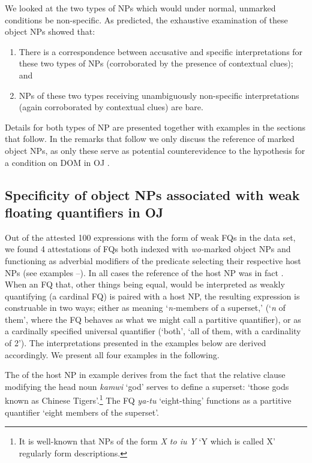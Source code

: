 \documentclass[output=paper]{LSP/langsci}
\begin{document}
We looked at the two types of NPs which would under normal, unmarked
conditions be non-specific. As predicted, the exhaustive examination
of these object NPs showed that:

\begin{exe}
\ex%
\label{07-fr-ex:8}
\renewcommand{\labelenumi}{\alph{enumi}}
\begin{enumerate}
\item There is a correspondence between accusative  and specific interpretations for these two types of NPs (corroborated by the presence of contextual clues); and 
\item NPs of these two types receiving unambiguously non-specific interpretations (again corroborated by contextual clues) are bare.
\end{enumerate}
\end{exe}

Details for both types of NP are presented together with examples in
the sections that follow. In the remarks that follow we only discuss
the reference of marked object NPs, as only these serve as potential
counterevidence to the hypothesis for a condition on DOM in OJ   .

\subsection{Specificity of object NPs associated with weak floating quantifiers in OJ}
\label{07-fr-sec:2-1}

Out of the attested 100 expressions with the form of weak FQs in the
data set, we found 4 attestations of FQs both indexed with
\textit{wo-}marked object NPs and functioning as adverbial
modifiers of the predicate selecting their respective host NPs (see
examples --). In all cases the reference of the host NP was in fact
. When an FQ that, other things being equal, would be
interpreted as weakly quantifying (\eg a cardinal FQ) is paired with
a  host NP, the resulting expression is construable in two
ways; either as meaning ‘\textit{n-}members of a  superset,’
(\ie ‘\textit{n} of them', where the FQ behaves as what we might
call a partitive quantifier), or as a cardinally specified universal
quantifier (\eg ‘both', \ie ‘all of them, with a cardinality of
2’). The interpretations presented in the examples below are derived
accordingly. We present all four examples in the following.

The  of the host NP in example  derives from the fact that the relative clause modifying the head noun \textit{kamwi} ‘god’ serves to define a  superset: ‘those gods known as Chinese Tigers’.\footnote{It is well-known that NPs of the form \textit{X to iu Y} ‘Y which is called X’ regularly form  descriptions.} The FQ \textit{ya-tu} ‘eight-thing’ functions as a partitive quantifier ‘eight members of the superset’. 
\end{document}
